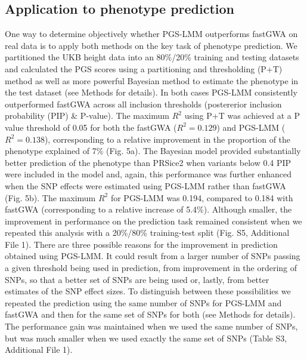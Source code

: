 \documentclass[doublespacing]{bmcart}
\begin{document}
\subsection*{Application to phenotype prediction }
One way to determine objectively whether PGS-LMM outperforms fastGWA on real data is to apply both methods on the key task of phenotype prediction. We partitioned the UKB height data into an 80\%/20\% training and testing datasets and calculated the PGS scores using a partitioning and thresholding (P+T) method as well as more powerful Bayesian method to estimate the phenotype in the test dataset (see Methods for details).  In both cases PGS-LMM consistently outperformed fastGWA across all inclusion thresholds (postererior inclusion probability (PIP) \& P-value).  The maximum $R^2$ using P+T was achieved at a P value threshold of 0.05 for both the fastGWA ($R^2= 0.129$) and PGS-LMM ($R^2= 0.138$), corresponding to a relative improvement in the proportion of the phenotype explained of 7\% (Fig. 5a). The Bayesian model provided substantially better prediction of the phenotype than PRSice2 when variants below 0.4 PIP were included in the model and, again, this performance was further enhanced when the SNP effects were estimated using PGS-LMM rather than fastGWA (Fig. 5b). The maximum $R^2$ for PGS-LMM was 0.194, compared to 0.184 with fastGWA (corresponding to a relative increase of 5.4\%). Although smaller, the improvement in performance on the prediction task remained consistent when we repeated this analysis with a 20\%/80\% training-test split (Fig. S5, Additional File 1). There are three possible reasons for the improvement in prediction obtained using PGS-LMM. It could result from a larger number of SNPs passing a given threshold being used in prediction, from improvement in the ordering of SNPs, so that a better set of SNPs are being used or, lastly, from better estimates of the SNP effect sizes. To distinguish between these possibilities we repeated the prediction using the same number of SNPs for PGS-LMM and fastGWA and then for the same set of SNPs for both (see Methods for details). The performance gain was maintained when we used the same number of SNPs, but was much smaller when we used exactly the same set of SNPs (Table S3, Additional File 1). 
\end{document}

